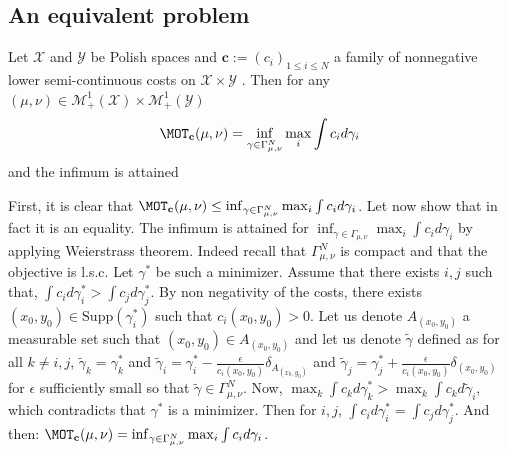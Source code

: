 \subsection{An equivalent problem}
\begin{prop}
\label{prop:equiv-max}
Let $\mathcal{X}$ and $\mathcal{Y}$ be Polish spaces and $\mathbf{c}:=(c_i)_{1\leq i\leq N}$ a family of nonnegative lower semi-continuous costs on $\mathcal{X}\times \mathcal{Y}$ . Then for any $(\mu,\nu)\in\mathcal{M}_+^{1}(\mathcal{X})\times\mathcal{M}_+^{1}(\mathcal{Y})$  
\begin{align*}
 \MOT_{\mathbf{c}}(\mu,\nu) = \inf_{\gamma\in\Gamma^N_{\mu,\nu}}\max_i\int c_id\gamma_i
 \end{align*}
and the infimum is attained
\end{prop}
\begin{prv*}

First, it is clear that $\MOT_{\mathbf{c}}(\mu,\nu) \leq  \inf_{\gamma\in\Gamma^N_{\mu,\nu}}\max_i\int c_id\gamma_i$. Let now show that in fact it is an equality. The infimum is attained for $\inf_{\gamma\in\Gamma_{\mu,\nu}}\max_i\int c_id\gamma_i$ by applying Weierstrass theorem. Indeed recall that $\Gamma^N_{\mu,\nu}$ is compact and that the objective is l.s.c. Let $\gamma^*$ be such a minimizer. Assume that there exists $i,j$ such that, $\int c_id\gamma^*_i>\int c_jd\gamma^*_j$. By non negativity of the costs, there exists $(x_0,y_0)\in \text{Supp}(\gamma^*_i)$ such that $c_i(x_0,y_0)>0$. Let us denote $A_{(x_0,y_0)}$ a measurable set such that $(x_0,y_0)\in A_{(x_0,y_0)}$ and let us denote $\tilde{\gamma}$ defined as for all $k\neq i,j$, $\tilde{\gamma}_k = \gamma_k^*$ and $\tilde{\gamma}_i = \gamma^*_i-\frac{\epsilon}{c_i(x_0,y_0)} \delta_{A_{(x_0,y_0)}}$ and $\tilde{\gamma}_j = \gamma^*_j+\frac{\epsilon}{c_i(x_0,y_0)} \delta_{(x_0,y_0)}$ for $\epsilon$ sufficiently small so that $\tilde{\gamma}\in\Gamma^N_{\mu,\nu}$. Now, $\max_k \int c_k d\gamma^*_k>\max_k \int c_k d\tilde{\gamma}_i$, which contradicts that $\gamma^*$ is a minimizer. Then for $i,j$, $\int c_id\gamma^*_i=\int c_jd\gamma^*_j$. And then:
$\MOT_{\mathbf{c}}(\mu,\nu) = \inf_{\gamma\in\Gamma^N_{\mu,\nu}}\max_i\int c_id\gamma_i$.
\end{prv*}



